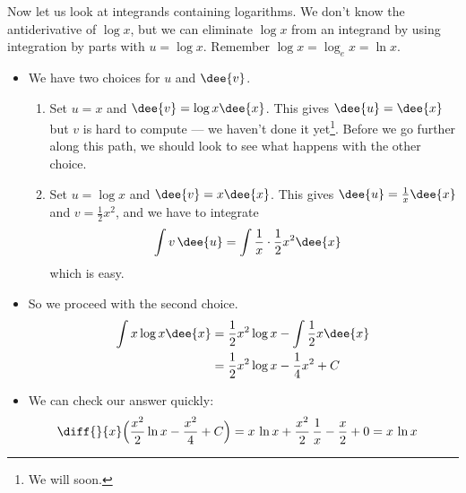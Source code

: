 Now let us look at integrands containing logarithms. We don't know the antiderivative of
$\log x$, but we can eliminate $\log x$ from an integrand by using integration by parts
with $u=\log x$. Remember $\log x = \log_e x = \ln x$.
\begin{eg}\label{eg:PRTSxlnx}
\soln
\begin{itemize}
 \item We have two choices for $u$ and $\dee{v}$.
\begin{enumerate}[(1)]
 \item Set $u=x$ and $\dee{v}=\log x\dee{x}$. This gives $\dee{u}=\dee{x}$ but
$v$ is hard to compute --- we haven't done it yet\footnote{We will soon.}.
Before we go further along this path, we should look to see what happens with
the other choice. \item Set $u=\log x$ and $\dee{v}=x\dee{x}$. This gives
$\dee{u}=\frac{1}{x}\dee{x}$ and $v=\frac{1}{2}x^2$, and we have to integrate
\begin{align*}
  \int v\, \dee{u} &= \int \frac{1}{x} \cdot \frac{1}{2}x^2 \dee{x}
\end{align*}
which is easy.
\end{enumerate}
\item So we proceed with the second choice.
\begin{align*}
  \int x \log x \dee{x}
  &= \frac{1}{2}x^2 \log x - \int \frac{1}{2} x \dee{x} \\
  &= \frac{1}{2}x^2 \log x - \frac{1}{4}x^2 +C
\end{align*}
\item We can check our answer quickly:
\begin{align*}
\diff{}{x} \Big(\frac{x^2}{2} \ln x -\frac{x^2}{4} +C\Big)
&= x\,\ln x + \frac{x^2}{2}\,\frac{1}{x} -\frac{x}{2}+0
=x\,\ln x
\end{align*}
\end{itemize}
\end{eg}


